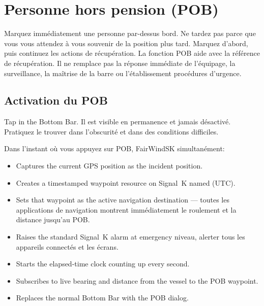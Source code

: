 \chapter{Personne hors pension (POB)}
\label{ch:pob}

\begin{warningbox}
Marquez immédiatement une personne par-dessus bord.
Ne tardez pas parce que vous vous attendez à vous souvenir de la position plus tard.
Marquez d'abord, puis continuez les actions de récupération.
La fonction POB aide avec la référence de récupération.
Il ne remplace pas la réponse immédiate de l'équipage, la surveillance, la maîtrise de la barre ou l'établissement
procédures d'urgence.
\end{warningbox}

\section{Activation du POB}

Tap  in the Bottom Bar.
Il est visible en permanence et jamais désactivé.
Pratiquez le trouver dans l'obscurité et dans des conditions difficiles.

Dans l'instant où vous appuyez sur POB, FairWindSK simultanément:

\begin{itemize}
  \item Captures the current GPS position as the incident position.
  \item Creates a timestamped waypoint resource on Signal~K named
         (UTC).
  \item Sets that waypoint as the active navigation destination ---
toutes les applications de navigation montrent immédiatement le roulement et la distance jusqu'au POB.
  \item Raises the standard Signal~K  alarm at emergency
niveau, alerter tous les appareils connectés et les écrans.
  \item Starts the elapsed-time clock counting up every second.
  \item Subscribes to live bearing and distance from the vessel to the POB waypoint.
  \item Replaces the normal Bottom Bar with the POB dialog.
\end{itemize}


